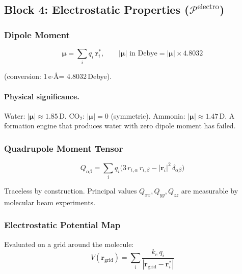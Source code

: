 \documentclass[11pt, a4paper, oneside]{article}
\theoremstyle{definition}
\theoremstyle{remark}
\begin{document}
\subsection{Block 4: Electrostatic Properties ($\mathcal{P}^{\text{electro}}$)}
\label{sec:block-electro}

\subsubsection{Dipole Moment}

\begin{equation}
\bm{\mu} = \sum_i q_i \, \mathbf{r}_i^*,
\qquad
|\bm{\mu}| \text{ in Debye} = |\bm{\mu}| \times 4.8032
\end{equation}

(conversion: 1\,e$\cdot$\AA = 4.8032\,Debye).

\paragraph{Physical significance.}
Water: $|\bm{\mu}| \approx 1.85$\,D.  CO$_2$: $|\bm{\mu}| = 0$
(symmetric).  Ammonia: $|\bm{\mu}| \approx 1.47$\,D.  A formation
engine that produces water with zero dipole moment has failed.

\subsubsection{Quadrupole Moment Tensor}

\begin{equation}
Q_{\alpha\beta} = \sum_i q_i
  \bigl(3\, r_{i,\alpha}\, r_{i,\beta} - |\mathbf{r}_i|^2\, \delta_{\alpha\beta}\bigr)
\end{equation}

Traceless by construction.  Principal values $Q_{xx}, Q_{yy}, Q_{zz}$
are measurable by molecular beam experiments.

\subsubsection{Electrostatic Potential Map}

Evaluated on a grid around the molecule:
\begin{equation}
V(\mathbf{r}_{\text{grid}}) = \sum_i \frac{k_e \, q_i}{|\mathbf{r}_{\text{grid}} - \mathbf{r}_i^*|}
\end{equation}
\end{document}
